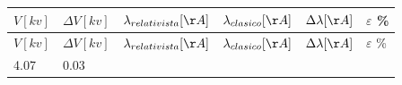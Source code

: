 \documentclass[]{article}
\begin{document}
\begin{longtable}[]{@{}llllll@{}}
\toprule
\begin{minipage}[b]{0.12\columnwidth}\raggedright
\(V[kv]\)\strut
\end{minipage} & \begin{minipage}[b]{0.16\columnwidth}\raggedright
\(\Delta V [kv]\)\strut
\end{minipage} & \begin{minipage}[b]{0.21\columnwidth}\raggedright
\(\lambda_{relativista} [\AA]\)\strut
\end{minipage} & \begin{minipage}[b]{0.14\columnwidth}\raggedright
\(\lambda_{clasico} [\AA]\)\strut
\end{minipage} & \begin{minipage}[b]{0.13\columnwidth}\raggedright
\(\Delta \lambda [\AA]\)\strut
\end{minipage} & \begin{minipage}[b]{0.08\columnwidth}\raggedright
\(\varepsilon\) \%\strut
\end{minipage}\tabularnewline
\midrule
\endfirsthead
\toprule
\begin{minipage}[b]{0.12\columnwidth}\raggedright
\(V[kv]\)\strut
\end{minipage} & \begin{minipage}[b]{0.16\columnwidth}\raggedright
\(\Delta V [kv]\)\strut
\end{minipage} & \begin{minipage}[b]{0.21\columnwidth}\raggedright
\(\lambda_{relativista} [\AA]\)\strut
\end{minipage} & \begin{minipage}[b]{0.14\columnwidth}\raggedright
\(\lambda_{clasico} [\AA]\)\strut
\end{minipage} & \begin{minipage}[b]{0.13\columnwidth}\raggedright
\(\Delta \lambda [\AA]\)\strut
\end{minipage} & \begin{minipage}[b]{0.08\columnwidth}\raggedright
\(\varepsilon\) \%\strut
\end{minipage}\tabularnewline
\midrule
\endhead
\begin{minipage}[t]{0.12\columnwidth}\raggedright
4.07\strut
\end{minipage} & \begin{minipage}[t]{0.16\columnwidth}\raggedright
0.03\strut
\end{minipage} & \begin{minipage}[t]{0.21\columnwidth}\raggedright

\end{minipage}
\end{longtable}
\end{document}
